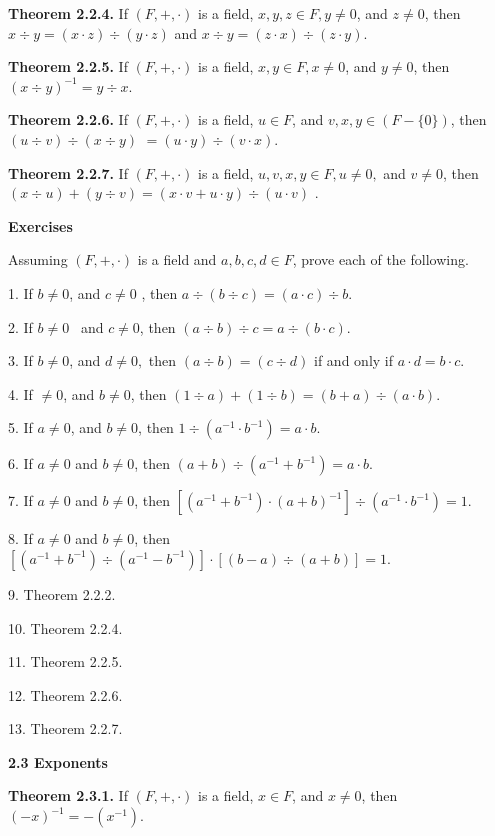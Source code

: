 \begin{large}
\textbf{Theorem 2.2.4.} If $(F,+,\cdot)$ is a field, $x,y,z\in F, y \neq 0$, and $z \neq 0$, then $x \div y =(x\cdot z) \div (y\cdot z)$ and $x \div y =(z \cdot x) \div (z \cdot y).$ \nl

\textbf{Theorem 2.2.5.} If $(F,+,\cdot)$ is a field, $x,y \in F, x \neq 0$, and $y \neq 0$, then $(x \div y)^{-1}= y\div x.$\nl

\textbf{Theorem 2.2.6.} If $(F,+,\cdot)$ is a field, $u \in F$, and $v,x,y \in (F - \{0\})$, then
$(u \div v) \div (x \div y) $
$= (u \cdot y) \div  (v \cdot x).$ \nl

\textbf{Theorem 2.2.7.} If $(F,+,\cdot)$ is a field, $u,v,x,y \in F, u \neq 0,$ and $v \neq 0$, then $(x\div u) + (y\div v) =(x \cdot v +u\cdot y)\div (u\cdot v)$ .\nl

\newpage
\textbf{Exercises} \nl

Assuming $(F,+,\cdot)$ is a field and $a,b,c,d \in F$, prove each of the following. \nl

1. If $b \neq 0$, and $c\neq 0$ , then $a \div (b\div c) =(a\cdot c)\div b$. \nl

2. If $b\neq 0$~ and $c \neq 0$, then $(a \div b)\div c =a\div (b\cdot c)$.\nl

3. If $b\neq 0$, and $d\neq 0,$ then $(a\div b)=(c\div d)$ if and only if $a\cdot d=b\cdot c.$ \nl

4. If $\neq 0$, and $b \neq 0$, then $(1\div a)+(1\div b)=(b + a)\div (a\cdot b)$. \nl

5. If $a \neq 0$, and $b \neq 0$, then $1\div (a^{-1}\cdot b^{-1})= a\cdot b.$ \nl

6. If  $a \neq 0$ and $b \neq 0$, then $(a + b)\div (a^{-1} + b^{-1}) = a\cdot b$. \nl

7. If  $a \neq 0$ and $b \neq 0$, then $[(a^{-1} + b^{-1})\cdot (a+b)^{-1}] \div (a^{-1}\cdot b^{-1}) = 1$. \nl

8. If   $a \neq 0$ and $b \neq 0$, then $[(a^{-1} + b^{-1}) \div (a^{-1} - b^{-1})]\cdot [( b- a)\div (a+b)] =1.$ \nl

9. Theorem 2.2.2.

10. Theorem 2.2.4.

11. Theorem 2.2.5.

12. Theorem 2.2.6.

13. Theorem 2.2.7.\nl

\textbf{2.3 Exponents}\nl

\textbf{Theorem 2.3.1.} If $(F,+,\cdot )$ is a field, $x\in F$, and $x \neq 0$, then $(-x)^{-1} = -(x^{-1}).$\nl


\end{large}
